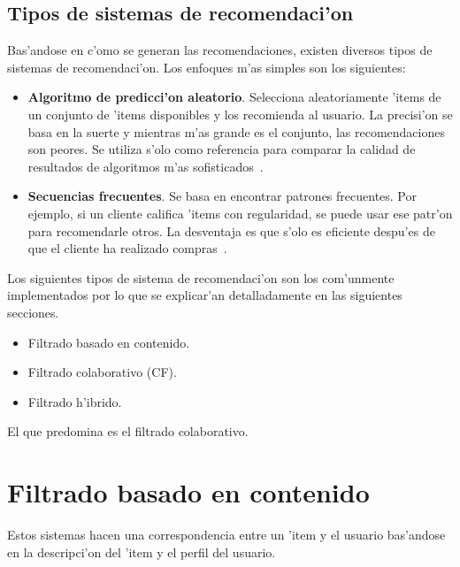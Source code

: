\documentclass[11pt]{article}
\begin{document}


\subsection{Tipos de sistemas de recomendaci'on}

Bas'andose en c'omo se generan las recomendaciones, existen diversos tipos de sistemas de recomendaci'on. Los enfoques m'as simples son los siguientes:
\begin{itemize}
\item \textbf{Algoritmo de predicci'on aleatorio}. Selecciona aleatoriamente 'items de un conjunto de 'items disponibles y los recomienda al usuario. La precisi'on se basa en la suerte y mientras m'as grande es el conjunto, las recomendaciones son peores. Se utiliza s'olo como referencia para comparar la calidad de resultados de algoritmos m'as sofisticados~\cite{almazrorecsys}.
\item \textbf{Secuencias frecuentes}. Se basa en encontrar patrones frecuentes. Por ejemplo, si un cliente califica 'items con regularidad, se puede usar ese patr'on para recomendarle otros. La desventaja es que s'olo es eficiente despu'es de que el cliente ha realizado compras~\cite{almazrorecsys}.
\end{itemize}

Los siguientes tipos de sistema de recomendaci'on son los com'unmente implementados por lo que se explicar'an detalladamente en las siguientes secciones.

\begin{itemize}
\item Filtrado basado en contenido.
\item Filtrado colaborativo (CF).
\item Filtrado h'ibrido.
\end{itemize}

El que predomina es el filtrado colaborativo.

\section{Filtrado basado en contenido}
Estos sistemas hacen una correspondencia entre un 'item y el usuario bas'andose en la descripci'on del 'item y el perfil del usuario.
\end{document}
